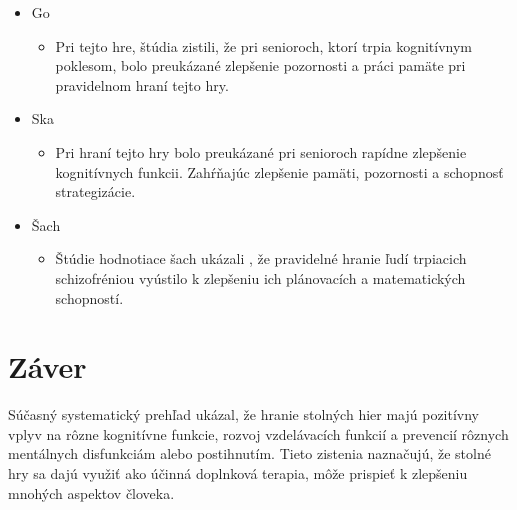 \documentclass[10pt,oneside,slovak,a4paper]{article}
\begin{document}
\begin{itemize}
    \item Go
    	\begin{itemize}
        	\item {Pri tejto hre, štúdia \cite{Aydin:2015} zistili, že pri senioroch, ktorí trpia kognitívnym poklesom, bolo preukázané zlepšenie pozornosti a práci pamäte pri pravidelnom hraní tejto hry.}
    	\end{itemize}
    \item Ska
        \begin{itemize}
        	\item{Pri hraní tejto hry bolo preukázané \cite{Panphunpho:2013} pri senioroch rapídne zlepšenie kognitívnych funkcii. Zahŕňajúc zlepšenie pamäti, pozornosti a schopnosť strategizácie.}
    	\end{itemize}
    \item Šach
        \begin{itemize}
        	\item{Štúdie hodnotiace šach ukázali \cite{Sala:2015, Demily:2009}, že pravidelné hranie ľudí trpiacich schizofréniou vyústilo k zlepšeniu ich plánovacích a matematických schopností.}
    	\end{itemize}
\end{itemize}

\section{Záver} \label{zaver} %
Súčasný systematický prehľad ukázal, že hranie stolných hier majú pozitívny vplyv na rôzne kognitívne funkcie, rozvoj vzdelávacích funkcií a prevencií rôznych mentálnych disfunkciám alebo postihnutím. Tieto zistenia naznačujú, že stolné hry sa dajú využiť ako účinná doplnková terapia, môže prispieť k zlepšeniu mnohých aspektov človeka.






\end{document}
